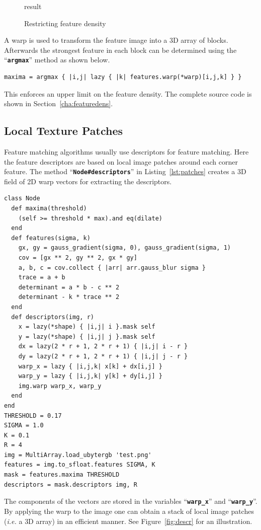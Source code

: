 \documentclass[12pt,a4paper,oneside,openright]{book}
\newcommand{\ie}{\emph{i.e.} }
\newcommand{\sct}[1]{Section~\ref{cha:#1}}
\newcommand{\fig}[1]{Figure~\ref{fig:#1}}
\newcommand{\lst}[1]{Listing~\ref{lst:#1}}
\newcommand{\code}[1]{``\texttt{\textbf{\textcolor{codegray}{\small{#1}}}}''}
\begin{document}
\begin{CJK}{UTF8}{}
\begin{figure}[htbp]
\begin{center}
\begin{minipage}[t]{.32\textwidth}
\begin{center}
        result
      \end{center}
    \end{minipage}
    \caption{Restricting feature density\label{fig:density}}
  \end{center}
\end{figure}
A warp is used to transform the feature image into a \ac{3D} array of blocks. Afterwards the strongest feature in each block can be determined using the \code{argmax} method as shown below.
\begin{lstlisting}
maxima = argmax { |i,j| lazy { |k| features.warp(*warp)[i,j,k] } }
\end{lstlisting}
This enforces an upper limit on the feature density. The complete source code is shown in \sct{featuredens}.

\subsection{Local Texture Patches}
Feature matching algorithms usually use descriptors for feature matching. Here the feature descriptors are based on local image patches around each corner feature. The method \code{Node\#descriptors} in \lst{patches} creates a \ac{3D} field of \ac{2D} warp vectors for extracting the descriptors.
\lstset{language=Ruby,frame=single,numbers=none}
\begin{lstlisting}[float,caption={Extracting local texture patches},escapechar=\$,label=lst:patches]
class Node
  def maxima(threshold)
    (self >= threshold * max).and eq(dilate)
  end
  def features(sigma, k)
    gx, gy = gauss_gradient(sigma, 0), gauss_gradient(sigma, 1)
    cov = [gx ** 2, gy ** 2, gx * gy]
    a, b, c = cov.collect { |arr| arr.gauss_blur sigma }
    trace = a + b
    determinant = a * b - c ** 2
    determinant - k * trace ** 2
  end
  def descriptors(img, r)
    x = lazy(*shape) { |i,j| i }.mask self
    y = lazy(*shape) { |i,j| j }.mask self
    dx = lazy(2 * r + 1, 2 * r + 1) { |i,j| i - r }
    dy = lazy(2 * r + 1, 2 * r + 1) { |i,j| j - r }
    warp_x = lazy { |i,j,k| x[k] + dx[i,j] }
    warp_y = lazy { |i,j,k| y[k] + dy[i,j] }
    img.warp warp_x, warp_y
  end
end
THRESHOLD = 0.17
SIGMA = 1.0
K = 0.1
R = 4
img = MultiArray.load_ubytergb 'test.png'
features = img.to_sfloat.features SIGMA, K
mask = features.maxima THRESHOLD
descriptors = mask.descriptors img, R
\end{lstlisting}
The components of the vectors are stored in the variables \code{warp\_x} and \code{warp\_y}. By applying the warp to the image one can obtain a stack of local image patches (\ie a \ac{3D} array) in an efficient manner. See \fig{descr} for an illustration.

\end{CJK}
\end{document}
